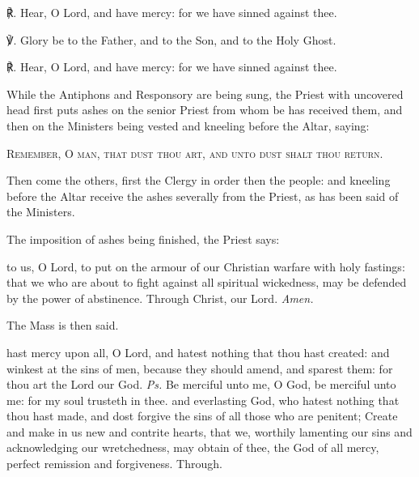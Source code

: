 ℟. Hear, O Lord, and have mercy: for we have sinned against thee.\par
℣. Glory be to the Father, and to the Son, and to the Holy Ghost.\par
℟. Hear, O Lord, and have mercy: for we have sinned against thee.\par
\begin{rubric}
    While the Antiphons and Responsory are being sung, the Priest with uncovered head first puts ashes on the senior Priest from whom be has received them, and then on the Ministers being vested and kneeling before the Altar, saying:
\end{rubric}
\begin{center}
    \textsc{Remember, O man, that dust thou art, and unto dust shalt thou return.}
\end{center}
\begin{rubric}
    Then come the others, first the Clergy in order then the people: and kneeling before the Altar receive the ashes severally from the Priest, as has been said of the Ministers.
\end{rubric}
\begin{rubric}
    The imposition of ashes being finished, the Priest says:
\end{rubric}
{} to us, O Lord, to put on the armour of our Christian warfare with holy fastings: that we who are about to fight against all spiritual wickedness, may be defended by the power of abstinence. Through Christ, our Lord. \textit{Amen.}
\begin{rubric}
    The Mass is then said.
\end{rubric}
\introit\label{AshWednesdayMass}
 hast mercy upon all, O Lord, and hatest nothing that thou hast created: and winkest at the sins of men, because they should amend, and sparest them: for thou art the Lord our God. \textit{Ps.} Be merciful unto me, O God, be merciful unto me: for my soul trusteth in thee.
\collect\label{AshWednesdayMassCollect}
 and everlasting God, who hatest nothing that thou hast made, and dost forgive the sins of all those who are penitent; Create and make in us new and contrite hearts, that we, worthily lamenting our sins and acknowledging our wretchedness, may obtain of thee, the God of all mercy, perfect remission and forgiveness. Through.

